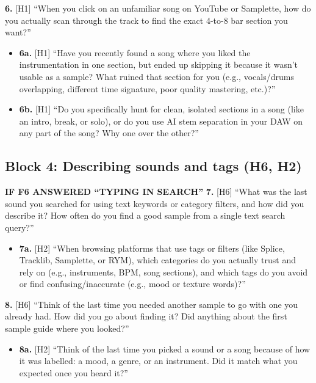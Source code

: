 \documentclass[12pt,a4paper]{report}
\begin{document}
\textbf{6.} [H1] “When you click on an unfamiliar song on YouTube or Samplette, how do you actually scan through the track to find the exact 4-to-8 bar section you want?”
\begin{itemize}[itemsep=2pt]
\item \textbf{6a.} [H1] “Have you recently found a song where you liked the instrumentation in one section, but ended up skipping it because it wasn’t usable as a sample? What ruined that section for you (e.g., vocals/drums overlapping, different time signature, poor quality mastering, etc.)?”
\item \textbf{6b.} [H1] “Do you specifically hunt for clean, isolated sections in a song (like an intro, break, or solo), or do you use AI stem separation in your DAW on any part of the song? Why one over the other?”
\end{itemize}

\subsection{Block 4: Describing sounds and tags (H6, H2)}
\textcolor{condition}{\textbf{IF F6 ANSWERED “TYPING IN SEARCH”}} \textbf{7.} [H6] “What was the last sound you searched for using text keywords or category filters, and how did you describe it? How often do you find a good sample from a single text search query?”
\begin{itemize}[itemsep=2pt]
\item \textbf{7a.} [H2] “When browsing platforms that use tags or filters (like Splice, Tracklib, Samplette, or RYM), which categories do you actually trust and rely on (e.g., instruments, BPM, song sections), and which tags do you avoid or find confusing/inaccurate (e.g., mood or texture words)?”
\end{itemize}

\textbf{8.} [H6] “Think of the last time you needed another sample to go with one you already had. How did you go about finding it? Did anything about the first sample guide where you looked?”
\begin{itemize}[itemsep=2pt]
\item \textbf{8a.} [H2] “Think of the last time you picked a sound or a song because of how it was labelled: a mood, a genre, or an instrument. Did it match what you expected once you heard it?”
\end{itemize}
\end{document}
